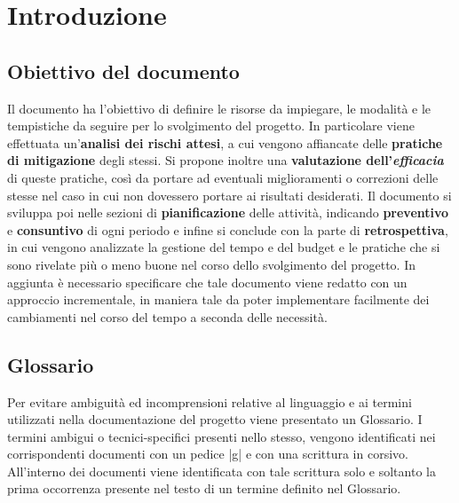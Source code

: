 \documentclass[10pt, a4paper]{article}
\title{\titolo}
\author{SWEetCode}
\begin{document}



\newpage

\tableofcontents
\newpage
\listoffigures
\newpage
\listoftables
\newpage


\section{Introduzione}

\subsection{Obiettivo del documento}
Il documento ha l'obiettivo di definire le risorse da impiegare, le modalità e le tempistiche da seguire per lo svolgimento del progetto. In particolare viene effettuata un'\textbf{analisi dei rischi attesi}, a cui vengono affiancate delle \textbf{pratiche di mitigazione} degli stessi. Si propone inoltre una \textbf{valutazione dell'\textit{efficacia\pg}} di queste pratiche, così da portare ad eventuali miglioramenti o correzioni delle stesse nel caso in cui non dovessero portare ai risultati desiderati.
Il documento si sviluppa poi nelle sezioni di \textbf{pianificazione} delle attività, indicando \textbf{preventivo} e \textbf{consuntivo} di ogni periodo e infine si conclude con la parte di \textbf{retrospettiva}, in cui vengono analizzate la gestione del tempo e del budget e le pratiche che si sono rivelate più o meno buone nel corso dello svolgimento del progetto.
In aggiunta è necessario specificare che tale documento viene redatto con un approccio incrementale, in maniera tale da poter implementare facilmente dei cambiamenti nel corso del tempo a seconda delle necessità.

\subsection{Glossario}
Per evitare ambiguità ed incomprensioni relative al linguaggio e ai termini utilizzati nella documentazione del progetto viene presentato un Glossario.
I termini ambigui o tecnici-specifici presenti nello stesso, vengono identificati nei corrispondenti documenti con un pedice |g| e con una scrittura in corsivo.
All'interno dei documenti viene identificata con tale scrittura solo e soltanto la prima occorrenza presente nel testo di un termine definito nel Glossario.
\end{document}
